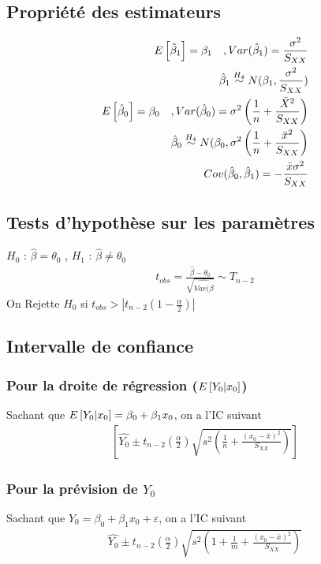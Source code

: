 \documentclass[10pt, french]{article}
\begin{document}
\begin{multicols*}{3}
\subsection*{Propriété des estimateurs}
\begin{align*}
E \left[ \hat{\beta}_1 \right] = \beta_1 \quad , Var(\hat{\beta}_1) = \frac{\sigma^2}{S_{XX}} \\
\hat{\beta}_1 \overset{H_4}{\sim} N(\beta_1, \frac{\sigma^2}{S_{XX}}) \\
E \left[ \hat{\beta}_0 \right] = \beta_0 \quad , Var(\hat{\beta}_0) = \sigma^2 \left( \frac{1}{n} + \frac{\bar{X}^2}{S_{XX}} \right) \\
\hat{\beta}_0 \overset{H_4}{\sim} N(\beta_0, \sigma^2 \left( \frac{1}{n}  + \frac{\bar{x}^2}{S_{XX}} \right) \\
Cov(\hat{\beta}_0, \hat{\beta}_1) = - \frac{\bar{x} \sigma^2}{S_{XX}}
\end{align*}

\subsection*{Tests d'hypothèse sur les paramètres}
$H_0$ : $\hat{\beta} = \theta_0$ , $H_1$ : $\hat{\beta} \neq \theta_0$
\begin{align*}
t_{obs} = \frac{\hat{\beta} - \theta_0}{\sqrt{\hat{Var(\hat{\beta}}}} \sim T_{n-2}
\end{align*}
On Rejette $H_0$ si $t_{obs} > | t_{n-2} (1 - \frac{\alpha}{2})|$

\subsection*{Intervalle de confiance}
\subsubsection*{Pour la droite de régression ($E \left[ Y_0|x_0 \right]$)}
Sachant que $E \left[ Y_0 | x_0 \right] = \beta_0 + \beta_1 x_0$, on a l'IC suivant
\begin{align*}
\left[ \hat{Y_0} \pm t_{n-2} \left(\frac{\alpha}{2} \right) \sqrt{s^2 \left( \frac{1}{n} + \frac{(x_0 - \bar{x})^2}{S_{XX}} \right)} \right]
\end{align*}

\subsubsection*{Pour la prévision de $Y_0$}
Sachant que $Y_0 = \beta_0 + \beta_1 x_0 + \varepsilon$, on a l'IC suivant
\begin{align*}
\hat{Y_0} \pm t_{n-2} \left(\frac{\alpha}{2} \right) \sqrt{s^2 \left( 1 + \frac{1}{m} + \frac{(x_0 - \bar{x})^2}{S_{XX}} \right)}
\end{align*}


\end{multicols*}
\end{document}
